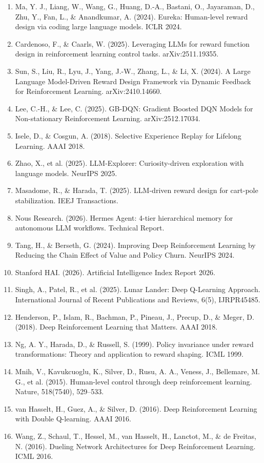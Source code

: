 \documentclass[conference,onecolumn,letterpaper,10pt]{IEEEtran}
\providecommand{\tightlist}{\setlength{\itemsep}{0pt}\setlength{\parskip}{0pt}}
\begin{document}
\begin{enumerate}
\def\labelenumi{[\arabic{enumi}]}
\tightlist
\item
  Ma, Y. J., Liang, W., Wang, G., Huang, D.-A., Bastani, O., Jayaraman, D., Zhu, Y., Fan, L., \& Anandkumar, A. (2024). Eureka: Human-level reward design via coding large language models. ICLR 2024.
\item
  Cardenoso, F., \& Caarls, W. (2025). Leveraging LLMs for reward function design in reinforcement learning control tasks. arXiv:2511.19355.
\item
  Sun, S., Liu, R., Lyu, J., Yang, J.-W., Zhang, L., \& Li, X. (2024). A Large Language Model-Driven Reward Design Framework via Dynamic Feedback for Reinforcement Learning. arXiv:2410.14660.
\item
  Lee, C.-H., \& Lee, C. (2025). GB-DQN: Gradient Boosted DQN Models for Non-stationary Reinforcement Learning. arXiv:2512.17034.
\item
  Isele, D., \& Cosgun, A. (2018). Selective Experience Replay for Lifelong Learning. AAAI 2018.
\item
  Zhao, X., et al. (2025). LLM-Explorer: Curiosity-driven exploration with language models. NeurIPS 2025.
\item
  Masadome, R., \& Harada, T. (2025). LLM-driven reward design for cart-pole stabilization. IEEJ Transactions.
\item
  Nous Research. (2026). Hermes Agent: 4-tier hierarchical memory for autonomous LLM workflows. Technical Report.
\item
  Tang, H., \& Berseth, G. (2024). Improving Deep Reinforcement Learning by Reducing the Chain Effect of Value and Policy Churn. NeurIPS 2024.
\item
  Stanford HAI. (2026). Artificial Intelligence Index Report 2026.
\item
  Singh, A., Patel, R., et al. (2025). Lunar Lander: Deep Q-Learning Approach. International Journal of Recent Publications and Reviews, 6(5), IJRPR45485.
\item
  Henderson, P., Islam, R., Bachman, P., Pineau, J., Precup, D., \& Meger, D. (2018). Deep Reinforcement Learning that Matters. AAAI 2018.
\item
  Ng, A. Y., Harada, D., \& Russell, S. (1999). Policy invariance under reward transformations: Theory and application to reward shaping. ICML 1999.
\item
  Mnih, V., Kavukcuoglu, K., Silver, D., Rusu, A. A., Veness, J., Bellemare, M. G., et al. (2015). Human-level control through deep reinforcement learning. Nature, 518(7540), 529--533.
\item
  van Hasselt, H., Guez, A., \& Silver, D. (2016). Deep Reinforcement Learning with Double Q-learning. AAAI 2016.
\item
  Wang, Z., Schaul, T., Hessel, M., van Hasselt, H., Lanctot, M., \& de Freitas, N. (2016). Dueling Network Architectures for Deep Reinforcement Learning. ICML 2016.
\end{enumerate}
\end{document}
